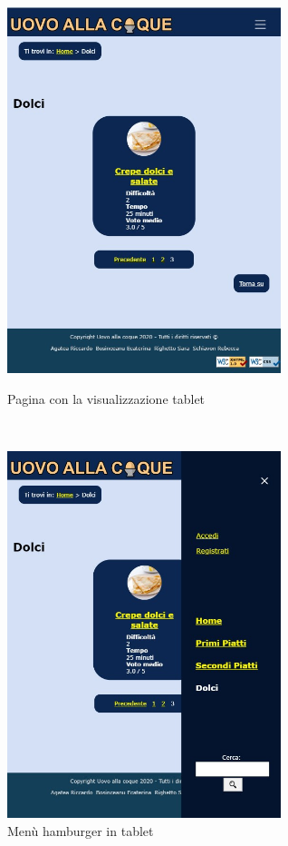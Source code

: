 \begin{figure}[H]
	\begin{minipage}[b]{8.5cm}
		\centering
		\includegraphics[width=8cm]{img/progettazione/tablet.jpg}
		\caption{Pagina con la visualizzazione tablet}
	\end{minipage}
	\ \hspace{2mm} \hspace{3mm} \
	\begin{minipage}[b]{8.5cm}
		\centering
		\includegraphics[width=8cm]{img/progettazione/tablet-menu.jpg}
		\caption{Menù hamburger in tablet}
	\end{minipage}
\end{figure}

